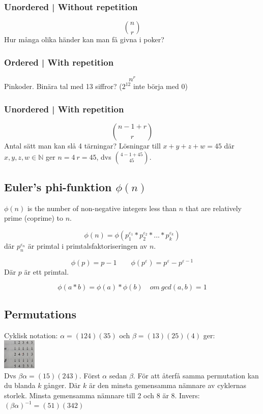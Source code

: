 \documentclass{article}
\begin{document}
\begin{multicols}{2}
{\begin{minipage}{28em}
\subsubsection{Unordered | Without repetition}
$$\binom{n}{r}$$
Hur många olika händer kan man få givna i poker?
\subsubsection{Ordered | With repetition}
$$n^r$$
Pinkoder. Binära tal med 13 siffror? ($2^{12}$ inte börja med 0)
\subsubsection{Unordered | With repetition}
$$\binom{n-1+r}{r}$$
Antal sätt man kan slå 4 tärningar? Lösningar till $x + y + z + w = 45$ där $x,y,z,w \in \mathbb{N}$ ger $n=4 \ r=45$, dvs $\binom{4-1+45}{45}$.

\end{minipage}}

\subsection{Euler's phi-funktion $\phi(n)$}

$\phi(n)$ is the number of non-negative integers less than $n$ that are relatively prime (coprime) to $n$.

$$\phi(n)=\phi(p^{\varepsilon_1}_1*p^{\varepsilon_2}_2*...*p^{\varepsilon_k}_k)$$
där $p^{\varepsilon_n}_n$ är primtal i primtalsfaktoriseringen av $n$.

$$\phi(p) = p-1 \quad \quad \phi(p^\varepsilon) = p^\varepsilon-p^{\varepsilon-1}$$
Där $p$ är ett primtal.

$$\phi(a*b) = \phi(a)*\phi(b) \quad om \ gcd(a,b)=1$$

\subsection{Permutations}

Cyklisk notation: $\alpha = (124)(35)$ och $\beta = (13)(25)(4)$ ger:\\
\includegraphics[width=0.12\textwidth]{images/partition}\\ Dvs $\beta \alpha = (15)(243)$. Först $\alpha$ sedan $\beta$. 
För att återfå samma permutation kan du blanda $k$ gånger. Där $k$ är den minsta gemensamma nämnare av cyklernas storlek. Minsta gemensamma nämnare till 2 och 8 är 8. Invers: $(\beta \alpha)^{-1} = (51)(342)$


\end{multicols}
\end{document}
